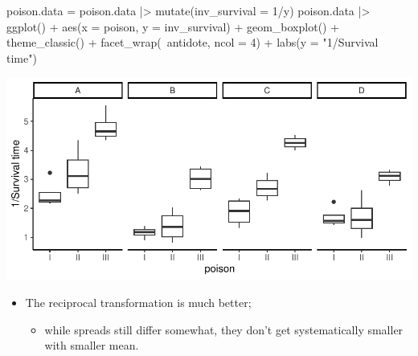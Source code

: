 \documentclass[a4paper]{article}\usepackage[]{graphicx}\usepackage[]{xcolor}
\makeatletter
\def\maxwidth{ %
  \ifdim\Gin@nat@width>\linewidth
    \linewidth
  \else
    \Gin@nat@width
  \fi
}
\makeatother
\begin{document}
\begin{Schunk}
\begin{Sinput}
poison.data = poison.data |> 
  mutate(inv_survival = 1/y)
poison.data |> ggplot() + 
  aes(x = poison, y = inv_survival) + 
  geom_boxplot() + 
  theme_classic() + 
  facet_wrap(~antidote, ncol = 4) + 
  labs(y = "1/Survival time")
\end{Sinput}


{\centering \includegraphics[width=\maxwidth]{figure/listings-unnamed-chunk-304-1} 

}

\end{Schunk}
\begin{itemize}
	\item The reciprocal transformation is much better;
	\begin{itemize}
		\item while spreads still differ somewhat, they don't get systematically smaller with smaller mean.
	\end{itemize}
\end{itemize}
\end{document}

